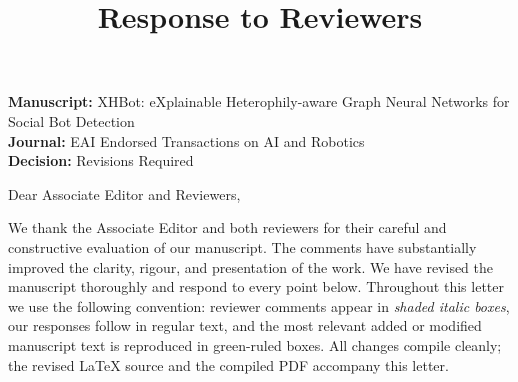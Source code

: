 \documentclass[11pt]{article}
\title{\vspace{-1.5cm}\textbf{Response to Reviewers}}
\author{}
\date{}
\begin{document}
\maketitle
\vspace{-2.2cm}

\noindent\textbf{Manuscript:} XHBot: eXplainable Heterophily-aware Graph Neural Networks for Social Bot Detection\\
\textbf{Journal:} EAI Endorsed Transactions on AI and Robotics\\
\textbf{Decision:} Revisions Required

\bigskip

\noindent Dear Associate Editor and Reviewers,

\medskip

We thank the Associate Editor and both reviewers for their careful and constructive
evaluation of our manuscript. The comments have substantially improved the clarity,
rigour, and presentation of the work. We have revised the manuscript thoroughly and
respond to every point below. Throughout this letter we use the following convention:
reviewer comments appear in \emph{shaded italic boxes}, our responses follow in
regular text, and the most relevant added or modified manuscript text is reproduced
in \textcolor{exrule}{green-ruled boxes}. All changes compile cleanly; the revised
LaTeX source and the compiled PDF accompany this letter.
\end{document}
